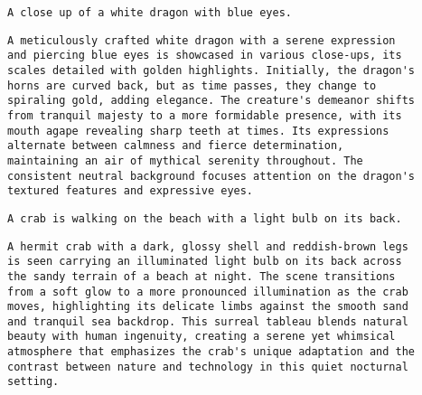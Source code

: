 
\begin{promptbox}
\begin{verbatim}
A close up of a white dragon with blue eyes.
\end{verbatim}
\end{promptbox}
\begin{promptbox}
\begin{verbatim}
A meticulously crafted white dragon with a serene expression 
and piercing blue eyes is showcased in various close-ups, its 
scales detailed with golden highlights. Initially, the dragon's
horns are curved back, but as time passes, they change to 
spiraling gold, adding elegance. The creature's demeanor shifts 
from tranquil majesty to a more formidable presence, with its 
mouth agape revealing sharp teeth at times. Its expressions 
alternate between calmness and fierce determination, 
maintaining an air of mythical serenity throughout. The 
consistent neutral background focuses attention on the dragon's
textured features and expressive eyes.
\end{verbatim}
\end{promptbox}



\begin{promptbox}
\begin{verbatim}
A crab is walking on the beach with a light bulb on its back.
\end{verbatim}
\end{promptbox}
\begin{promptbox}
\begin{verbatim}
A hermit crab with a dark, glossy shell and reddish-brown legs
is seen carrying an illuminated light bulb on its back across 
the sandy terrain of a beach at night. The scene transitions 
from a soft glow to a more pronounced illumination as the crab
moves, highlighting its delicate limbs against the smooth sand
and tranquil sea backdrop. This surreal tableau blends natural
beauty with human ingenuity, creating a serene yet whimsical 
atmosphere that emphasizes the crab's unique adaptation and the
contrast between nature and technology in this quiet nocturnal
setting.
\end{verbatim}
\end{promptbox}


